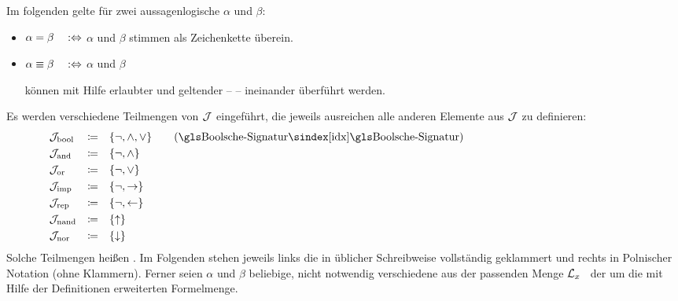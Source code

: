 Im folgenden gelte für zwei aussagenlogische  $\alpha$ und $\beta$:
\begin{itemize}
	\item[] $\alpha =    \beta \quad :\Leftrightarrow$ \quad $\alpha$ und $\beta$
	stimmen als Zeichenkette überein.
	\item[] $\alpha \equiv \beta \quad :\Leftrightarrow$ \quad $\alpha$ und $\beta$
	\parbox[t]{11cm}{können mit Hilfe erlaubter  und geltender  --  -- ineinander überführt werden.}
\end{itemize}
%
Es werden verschiedene Teilmengen von $\mathcal{J}$ eingeführt, die jeweils ausreichen alle anderen Elemente aus $\mathcal{J}$ zu definieren:
\begin{align}
	& \alJun_\iBool & \defeq & \quad\{ \lnot, \land, \lor \} \label{def:Jbool}
	\qquad (\text{\glsIdx{Boolsche-Signatur}})
	\\
	& \alJun_\iAnd  & \defeq & \quad\{ \lnot, \land       \} \label{def:Jand}
	\\
	& \alJun_\iOr   & \defeq & \quad\{ \lnot, \lor        \} \label{def:Jor}
	\\
	& \alJun_\iImp  & \defeq & \quad\{ \lnot, \limp       \} \label{def:Jimp}
	\\
	& \alJun_\iRep  & \defeq & \quad\{ \lnot, \lrep       \} \label{def:Jrep}
	\\
	& \alJun_\iNand & \defeq & \quad\{ \lnand             \} \label{def:Jnand}
	\\
	& \alJun_\iNor  & \defeq & \quad\{ \lnor              \} \label{def:Jnor}
	\formulatoleft\formulatoleft\formulatoleft
\end{align}
Solche Teilmengen heißen .
%
Im Folgenden stehen jeweils links die  in üblicher Schreibweise vollständig geklammert und rechts in Polnischer Notation (ohne Klammern).
Ferner seien $\alpha$ und $\beta$ beliebige, nicht notwendig verschiedene  aus der passenden Menge $\mathcal{L}_x$ \textbzgl\ der um die mit Hilfe der Definitionen erweiterten Formelmenge.

